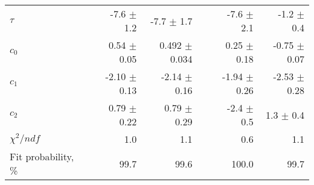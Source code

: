 \begin{table}[H]
{\begin{tabular}{lrrrrrr}

    \rule{0pt}{4ex}$\tau$  && -7.6 $\pm$ 1.2 & -7.7 $\pm$ 1.7 && -7.6 $\pm$ 2.1 & -1.2 $\pm$ 0.4 \\
    $c_0$  && 0.54 $\pm$ 0.05 & 0.492 $\pm$ 0.034 && 0.25 $\pm$ 0.18 & -0.75 $\pm$ 0.07 \\
    $c_1$  && -2.10 $\pm$ 0.13 & -2.14 $\pm$ 0.16 && -1.94 $\pm$ 0.26 & -2.53 $\pm$ 0.28 \\
    $c_2$  && 0.79 $\pm$ 0.22 & 0.79 $\pm$ 0.29 && -2.4 $\pm$ 0.5 & 1.3 $\pm$ 0.4 \\

    \rule{0pt}{4ex}$\chi^2/ndf$  && 1.0 & 1.1 && 0.6 & 1.1 \\
    Fit probability, \%  && 99.7 & 99.6 && 100.0 & 99.7 \\
    \bottomrule
\end{tabular}
}
\label{tab:chib:ups2s:fits}
\end{table}